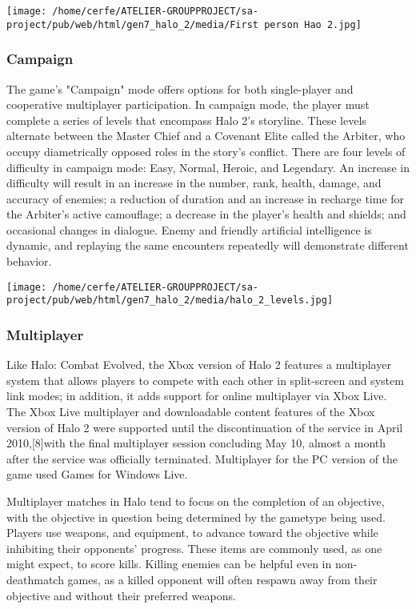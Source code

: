 \documentclass[a4paper,10pt]{book}
\begin{document}
 \texttt{[image: /home/cerfe/ATELIER-GROUPPROJECT/sa-project/pub/web/html/gen7\_halo\_2/media/First person Hao 2.jpg]}
 
 \subsubsection{ Campaign }
 
          The game's "Campaign" mode offers options for both single-player and cooperative multiplayer participation. In campaign mode, the player must complete a series of levels that encompass Halo 2's storyline.
          These levels alternate between the Master Chief and a Covenant Elite called the Arbiter, who occupy diametrically opposed roles in the story's conflict. 
          There are four levels of difficulty in campaign mode: Easy, Normal, Heroic, and Legendary. An increase in difficulty will result in an increase in the number, rank, health, damage, and accuracy of enemies;
          a reduction of duration and an increase in recharge time for the Arbiter's active camouflage; a decrease in the player's health and shields; and occasional changes in dialogue.
          Enemy and friendly artificial intelligence is dynamic, and replaying the same encounters repeatedly will demonstrate different behavior.
         
 \texttt{[image: /home/cerfe/ATELIER-GROUPPROJECT/sa-project/pub/web/html/gen7\_halo\_2/media/halo\_2\_levels.jpg]}
 
 \subsubsection{Multiplayer }
 
          Like Halo: Combat Evolved, the Xbox version of Halo 2 features a multiplayer system that allows players to compete with each other in split-screen and system link modes; in addition, it adds support for online multiplayer via Xbox Live.
          The Xbox Live multiplayer and downloadable content features of the Xbox version of Halo 2 were supported until the discontinuation of the service in April 2010,[8]with the final multiplayer session concluding May 10, almost a month after the service was officially terminated.
          Multiplayer for the PC version of the game used Games for Windows  Live.
         
 
          Multiplayer matches in Halo tend to focus on the completion of an objective, with the objective in question being determined by the gametype being used. Players use weapons, and equipment, to advance toward the objective while inhibiting their opponents' progress.
          These items are commonly used, as one might expect, to score kills.  Killing enemies can be helpful even in non-deathmatch games, as a killed opponent will often respawn away from their objective and without their preferred weapons.
         
\end{document}
